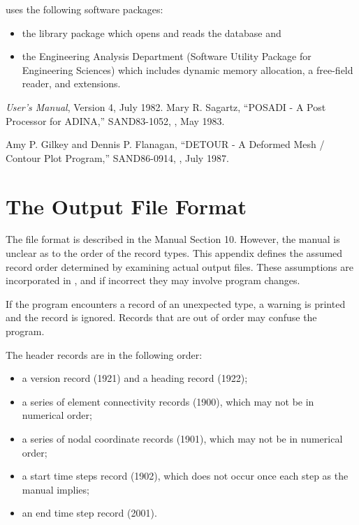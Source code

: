\caps{\PROGRAM} uses the following software packages:
\setlength{\itemsep}{\medskipamount} \begin{itemize}
\item the  library package which opens and reads the
 database and
\item the Engineering Analysis Department  \cite{bib:supes}
(Software Utility Package for Engineering Sciences) which includes
dynamic memory allocation, a free-field reader, and 
extensions.
\end{itemize}

\setlength{\itemsep}{\bigskipamount}
\begin{thebibliography}{99}
%
{\em {} User's Manual}, Version 4, July 1982.
%
Mary R. Sagartz,
``POSADI - A Post Processor for ADINA,''
SAND83-1052, \SNLA, May 1983.
%

%
Amy P. Gilkey and Dennis P. Flanagan,
``DETOUR - A Deformed Mesh / Contour Plot Program,''
SAND86-0914, \SNLA, July 1987.
%

%

%
\end{thebibliography}

\appendix

\chapter{The  Output File Format} \label{appx:abaqus}

The  file format is described in the  Manual
Section 10. However, the manual is unclear as to the order of the record
types. This appendix defines the assumed record order determined by
examining actual  output files. These assumptions are
incorporated in \caps{\PROGRAM}, and if incorrect they may involve
program changes.

If the program encounters a record of an unexpected type, a warning is
printed and the record is ignored. Records that are out of order may
confuse the program.

The header records are in the following order:
\setlength{\itemsep}{\medskipamount} \begin{itemize}
\item a version record (1921) and a heading record (1922);
\item a series of element connectivity records (1900), which may not be
in numerical order;
\item a series of nodal coordinate records (1901), which may not be in
numerical order;
\item a start time steps record (1902), which does not occur once each
step as the manual implies;
\item an end time step record (2001).
\end{itemize}

